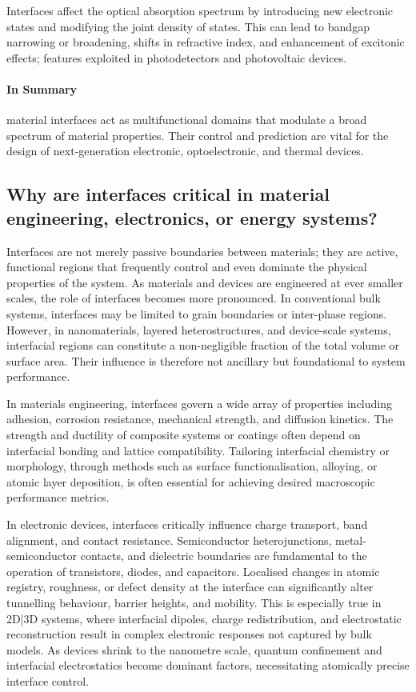 Interfaces affect the optical absorption spectrum by introducing new electronic states and modifying the joint
density of states. This can lead to bandgap narrowing or broadening, shifts in refractive index, and enhancement of
excitonic effects; features exploited in photodetectors and photovoltaic devices.

\paragraph{In Summary} material interfaces act as multifunctional domains that modulate a broad spectrum of material
properties. Their control and prediction are vital for the design of next-generation electronic, optoelectronic, and
thermal devices.

\subsection{Why are interfaces critical in material engineering, electronics, or energy systems?}

Interfaces are not merely passive boundaries between materials; they are active, functional regions that frequently
control and even dominate the physical properties of the system. As materials and devices are engineered at ever
smaller scales, the role of interfaces becomes more pronounced. In conventional bulk systems, interfaces may be
limited to grain boundaries or inter-phase regions. However, in nanomaterials, layered heterostructures, and
device-scale systems, interfacial regions can constitute a non-negligible fraction of the total volume or surface
area. Their influence is therefore not ancillary but foundational to system performance.

In materials engineering, interfaces govern a wide array of properties including adhesion, corrosion resistance,
mechanical strength, and diffusion kinetics. The strength and ductility of composite systems or coatings often
depend on interfacial bonding and lattice compatibility. Tailoring interfacial chemistry or morphology, through
methods such as surface functionalisation, alloying, or atomic layer deposition, is often essential for achieving
desired macroscopic performance metrics.

In electronic devices, interfaces critically influence charge transport, band alignment, and contact resistance.
Semiconductor heterojunctions, metal-semiconductor contacts, and dielectric boundaries are fundamental to the
operation of transistors, diodes, and capacitors. Localised changes in atomic registry, roughness, or defect density
at the interface can significantly alter tunnelling behaviour, barrier heights, and mobility. This is especially
true in 2D|3D systems, where interfacial dipoles, charge redistribution, and electrostatic reconstruction result in
complex electronic responses not captured by bulk models. As devices shrink to the nanometre scale, quantum
confinement and interfacial electrostatics become dominant factors, necessitating atomically precise interface control.

